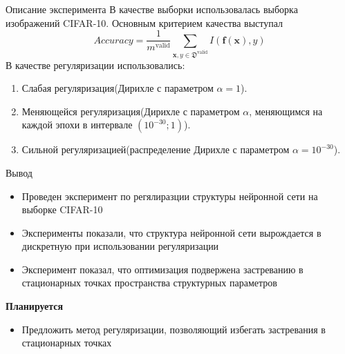 \documentclass[10pt]{beamer}
\begin{document}
\begin{frame}{Описание эксперимента}
В качестве выборки использовалась выборка изображений CIFAR-10. Основным критерием качества выступал 
$$Accuracy = \frac{1}{m^\text{valid}}\sum_{\mathbf{x}, y \in \mathfrak{D}^\text{valid}} I(\mathbf{f}(\mathbf{x}), y)$$
В качестве регуляризации использовались:\\
\begin{enumerate}
    \item Слабая регуляризация(Дирихле с параметром $\alpha = 1$).\\
    \item Меняющейся регуляризация(Дирихле с параметром $\alpha$, меняющимся на каждой эпохи в интервале $(10^{-30}; 1)$).\\
    \item Сильной регуляризацией(распределение Дирихле с параметром  $\alpha= 10^{-30}$).\\
\end{enumerate}
\end{frame}


\begin{frame}{Вывод}

\begin{itemize}
	\item Проведен эксперимент по регялиразции структуры нейронной сети на выборке CIFAR-10
	\item Эксперименты показали, что структура нейронной сети вырождается в дискретную при использовании регуляризации
	\item Эксперимент показал, что оптимизация подвержена застреванию в стационарных точках пространства структурных параметров
\end{itemize}

{\bf Планируется}\\
	\begin{itemize}
		\item Предложить метод регуляризации, позволяющий избегать застревания в стационарных точках
	\end{itemize}

\end{frame}
\end{document}

